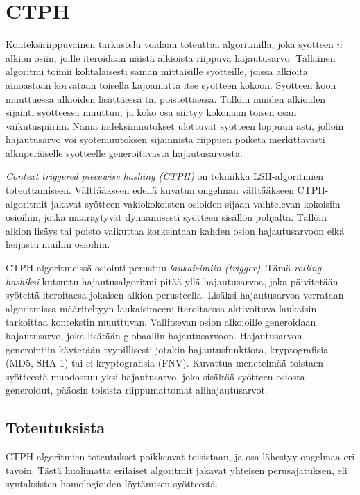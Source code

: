 \documentclass{article}
\begin{document}
	\section*{CTPH}

	Konteksiriippuvainen tarkastelu voidaan toteuttaa algoritmilla, joka
	syötteen $n$ alkion osiin, joille iteroidaan näistä alkioista riippuva
	hajautusarvo. Tällainen algoritmi toimii kohtalaisesti saman mittaisille
	syötteille, joissa alkioita ainoastaan korvataan toisella kajoamatta
	itse syötteen kokoon. Syötteen koon muuttuessa alkioiden lisättäessä
	tai poistettaessa. Tällöin muiden alkioiden sijainti syötteessä muuttuu,
	ja koko osa siirtyy kokonaan toisen osan vaikutuspiiriin. Nämä
	indeksimuutokset ulottuvat syötteen loppuun asti, jolloin hajautusarvo
	voi syötemuutoksen sijainnista riippuen poiketa merkittävästi
	alkuperäiselle syötteelle generoitavasta hajautusarvosta.

	\textit{Context triggered piecewise hashing (CTPH)} on tekniikka LSH-algoritmien
	toteuttamiseen. Välttääkseen edellä kuvatun ongelman välttääkseen
	CTPH-algoritmit jakavat syötteen vakiokokoisten	osioiden sijaan vaihtelevan kokoisiin osioihin, jotka määräytyvät dynaamisesti syötteen sisällön
	pohjalta. Tällöin alkion lisäys tai poisto vaikuttaa korkeintaan kahden
	osion hajautusarvoon eikä heijastu muihin osioihin.

	CTPH-algoritmeissä osiointi perustuu \textit{laukaisimiin (trigger)}.
	Tämä \textit{rolling hashiksi} kutsuttu hajautusalgoritmi pitää yllä
	hajautusarvoa, joka päivitetään syötettä iteroitaesa jokaisen
	alkion perusteella. Lisäksi hajautusarvoa verrataan algoritmissa
	määriteltyyn laukaisimeen: iteroitaessa aktivoituva laukaisin tarkoittaa
	kontekstin muuttuvan. Vallitsevan osion alkoioille generoidaan
	hajautusarvo, joka lisätään globaaliin hajautusarvoon. Hajautusarvon
	generointiin käytetään tyypillisesti jotakin hajautusfunktiota, kryptografisia (MD5, SHA-1) tai ei-kryptografisia (FNV). Kuvattua menetelmää
	toistaen syötteestä muodostuu yksi hajautusarvo, joka sisältää syötteen
	osiosta generoidut, pääosin toisista riippumattomat alihajautusarvot.

	\subsection*{Toteutuksista}

	CTPH-algoritmien toteutukset poikkeavat toisistaan, ja osa lähestyy
	ongelmaa eri tavoin. Tästä huolimatta erilaiset algoritmit jakavat
	yhteisen perusajatuksen, eli syntaksisten homologioiden löytämisen
	syötteestä.
\end{document}
